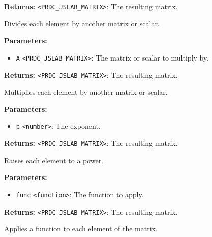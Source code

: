 \documentclass[12pt,a4paper]{article}
\begin{document}
\noindent \textbf{Returns:} \texttt{<PRDC\_JSLAB\_MATRIX>}: The resulting matrix.

\noindent Divides each element by another matrix or scalar.

\vspace{5mm}
\noindent {}


\noindent \textbf{Parameters:}
\begin{itemize}
  \item \texttt{A} \texttt{<PRDC\_JSLAB\_MATRIX>}: The matrix or scalar to multiply by.
\end{itemize}

\noindent \textbf{Returns:} \texttt{<PRDC\_JSLAB\_MATRIX>}: The resulting matrix.

\noindent Multiplies each element by another matrix or scalar.

\vspace{5mm}
\noindent {}


\noindent \textbf{Parameters:}
\begin{itemize}
  \item \texttt{p} \texttt{<number>}: The exponent.
\end{itemize}

\noindent \textbf{Returns:} \texttt{<PRDC\_JSLAB\_MATRIX>}: The resulting matrix.

\noindent Raises each element to a power.

\vspace{5mm}
\noindent {}


\noindent \textbf{Parameters:}
\begin{itemize}
  \item \texttt{func} \texttt{<function>}: The function to apply.
\end{itemize}

\noindent \textbf{Returns:} \texttt{<PRDC\_JSLAB\_MATRIX>}: The resulting matrix.

\noindent Applies a function to each element of the matrix.

\vspace{5mm}
\noindent {}
\end{document}
